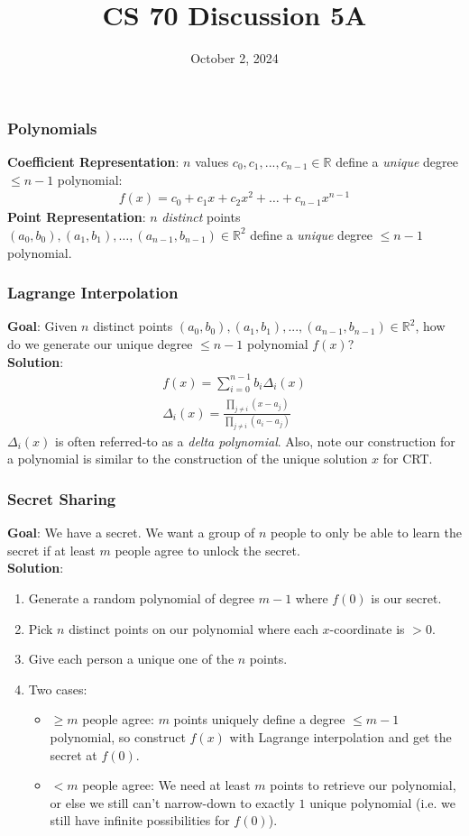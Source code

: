 \documentclass{beamer}
\title{CS 70 Discussion 5A}
\date{October 2, 2024}
\begin{document}
\frame{\titlepage}

\begin{frame}
    \frametitle{Polynomials}
    {\bf Coefficient Representation}: $n$ values $c_0,c_1,...,c_{n-1}\in\mathbb{R}$ define a {\it unique} degree $\leq n-1$ polynomial:
    \begin{gather*}
        f(x)=c_0+c_1x+c_2x^2+\dots+c_{n-1}x^{n-1}
    \end{gather*}
    {\bf Point Representation}: $n$ {\it distinct} points $(a_0,b_0),(a_1,b_1),\dots,(a_{n-1},b_{n-1})\in\mathbb{R}^2$ define a {\it unique} degree $\leq n-1$ polynomial.
\end{frame}

\begin{frame}
    \frametitle{Lagrange Interpolation}
    {\bf Goal}: Given $n$ distinct points $(a_0,b_0),(a_1,b_1),...,(a_{n-1},b_{n-1})\in\mathbb{R}^2$, how do we generate our unique degree $\leq n-1$ polynomial $f(x)$?\\
    {\bf Solution}:
    \begin{gather*}
        f(x)=\sum_{i=0}^{n-1}b_i\Delta_i(x)\\
        \Delta_i(x)=\frac{\prod_{j\neq i}(x-a_j)}{\prod_{j\neq i}(a_i-a_j)}
    \end{gather*}
    $\Delta_i(x)$ is often referred-to as a {\it delta polynomial}. Also, note our construction for a polynomial is similar to the construction of the unique solution $x$ for CRT.
\end{frame}

\begin{frame}
    \frametitle{Secret Sharing}
    {\bf Goal}: We have a secret. We want a group of $n$ people to only be able to learn the secret if at least $m$ people agree to unlock the secret.\\
    {\bf Solution}:
    \begin{enumerate}
        \item Generate a random polynomial of degree $m-1$ where $f(0)$ is our secret.
        \item Pick $n$ distinct points on our polynomial where each $x$-coordinate is $>0$.
        \item Give each person a unique one of the $n$ points.
        \item Two cases: \begin{itemize}
            \item $\geq m$ people agree: $m$ points uniquely define a degree $\leq m-1$ polynomial, so construct $f(x)$ with Lagrange interpolation and get the secret at $f(0)$.
            \item $<m$ people agree: We need at least $m$ points to retrieve our polynomial, or else we still can't narrow-down to exactly $1$ unique polynomial (i.e. we still have infinite possibilities for $f(0)$).
        \end{itemize}
    \end{enumerate}
\end{frame}
\end{document}
